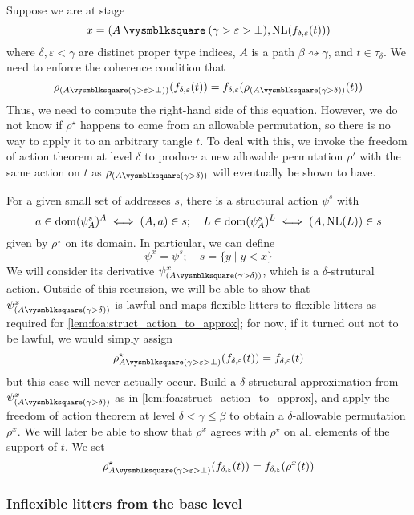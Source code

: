Suppose we are at stage
\[ x = (A \pcomp (\gamma > \varepsilon > \bot), \NL(f_{\delta,\varepsilon}(t))) \]
where \( \delta, \varepsilon < \gamma \) are distinct proper type indices, \( A \) is a path \( \beta \rightsquigarrow \gamma \), and \( t \in \tau_\delta \).
We need to enforce the coherence condition that
\[ \rho_{(A \pcomp (\gamma > \varepsilon > \bot))}(f_{\delta,\varepsilon}(t)) = f_{\delta,\varepsilon}(\rho_{(A \pcomp (\gamma > \delta))}(t)) \]
Thus, we need to compute the right-hand side of this equation.
However, we do not know if \( \rho^\star \) happens to come from an allowable permutation, so there is no way to apply it to an arbitrary tangle \( t \).
To deal with this, we invoke the freedom of action theorem at level \( \delta \) to produce a new allowable permutation \( \rho' \) with the same action on \( t \) as \( \rho_{(A \pcomp (\gamma > \delta))} \) will eventually be shown to have.

For a given small set of addresses \( s \), there is a structural action \( \psi^s \) with
\[ a \in \operatorname{dom} (\psi^s_A)^A \iff (A, a) \in s;\quad L \in \operatorname{dom} (\psi^s_A)^L \iff (A, \operatorname{NL}(L)) \in s \]
given by \( \rho^\star \) on its domain.
In particular, we can define
\[ \psi^x = \psi^s;\quad s = \{ y \mid y < x \} \]
We will consider its derivative \( \psi^x_{(A \pcomp (\gamma > \delta))} \), which is a \( \delta \)-strutural action.
Outside of this recursion, we will be able to show that \( \psi^x_{(A \pcomp (\gamma > \delta))} \) is lawful and maps flexible litters to flexible litters as required for \cref{lem:foa:struct_action_to_approx}; for now, if it turned out not to be lawful, we would simply assign
\[ \rho^\star_{A \pcomp (\gamma > \varepsilon > \bot)}(f_{\delta,\varepsilon}(t)) = f_{\delta,\varepsilon}(t) \]
but this case will never actually occur.
Build a \( \delta \)-structural approximation from \( \psi^x_{(A \pcomp (\gamma > \delta))} \) as in \cref{lem:foa:struct_action_to_approx}, and apply the freedom of action theorem at level \( \delta < \gamma \leq \beta \) to obtain a \( \delta \)-allowable permutation \( \rho^x \).
We will later be able to show that \( \rho^x \) agrees with \( \rho^\star \) on all elements of the support of \( t \).
We set
\[ \rho^\star_{A \pcomp (\gamma > \varepsilon > \bot)}(f_{\delta,\varepsilon}(t)) = f_{\delta,\varepsilon}(\rho^x(t)) \]

\subsubsection{Inflexible litters from the base level}
\label{ss:foa:inflexible_bot}

